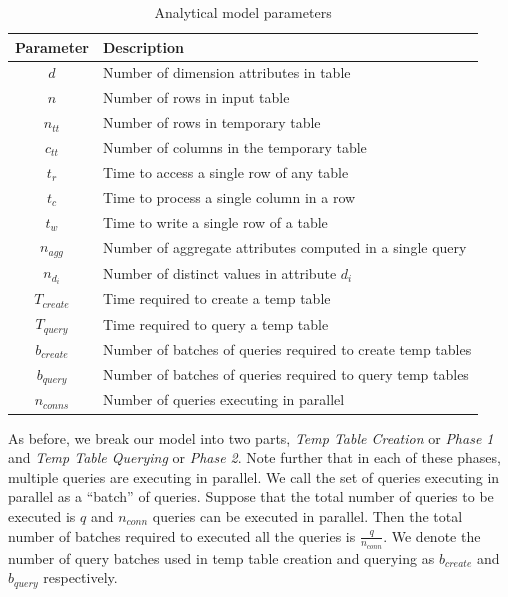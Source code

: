 \begin{table}
{\center
\vspace{-10pt}
\begin{tabular}[h]{|c|p{5.5cm}|}
\hline
Parameter & Description \\ \hline
$d$ & Number of dimension attributes in table \\
$n$ & Number of rows in input table \\
$n_{tt}$ & Number of rows in temporary table \\
$c_{tt}$ & Number of columns in the temporary table \\
$t_r$ & Time to access a single row of any table \\
$t_c$ & Time to process a single column in a row \\
$t_w$ & Time to write a single row of a table \\
$n_{agg}$ & Number of aggregate attributes computed in a single query \\
$n_{d_{i}}$ & Number of distinct values in attribute $d_i$ \\
$T_{create}$ & Time required to create a temp table \\
$T_{query}$ & Time required to query a temp table \\ 
$b_{create}$ & Number of batches of queries required to create temp tables \\
$b_{query}$ & Number of batches of queries required to query temp tables \\
$n_{conns}$ & Number of queries executing in parallel \\ \hline
\end{tabular}
\vspace{-10pt}
\caption{Analytical model parameters \label{tab:model_params}}
}
\end{table}


As before, we break our model into two parts, {\it Temp Table Creation} or {\it
Phase 1} and {\it Temp Table Querying} or {\it Phase 2}. Note further that in
each of these phases, multiple queries are executing in parallel. We call the
set of queries executing in parallel as a ``batch'' of queries. Suppose that the
total number of queries to be executed is $q$ and $n_{conn}$ queries can be
executed in parallel. Then the total number of batches required to executed all
the queries is $\frac{q}{n_{conn}}$. We denote the number of query batches used
in temp table creation and querying as $b_{create}$ and $b_{query}$ respectively.

